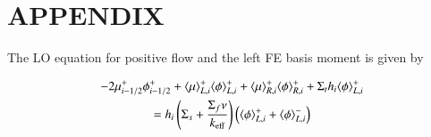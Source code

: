 \documentclass[10pt,twocolumn,pdftex,superscriptaddress]{anstrans}
\newcommand{\mom}[1]{\langle #1 \rangle}
\newcommand{\keff}{\ensuremath{k_{\text{eff}}}}
\newcommand{\sig}[1]{\ensuremath{\Sigma_{#1}}}
\begin{document}
\section*{APPENDIX}
\appendix 

The LO equation for positive flow and the left FE basis moment is given by
\vspace{-0.02in}

\begin{multline}\small 
\label{lo_eq}
    -2{\mu}_{i-1/2}^+ \phi_{i-1/2}^+ + \mom {\mu}_{L,i}^+ \mom{\phi}_{L,i}^+ +
    \mom\mu_{R,i}^+ 
    \mom{\phi}_{R,i}^+ + \Sigma_t h_i \mom{\phi}_{L,i}^+ \\ = h_i \left(\Sigma_s + 
    \frac{\sig f \nu}{\keff} \right)   \left( \mom{\phi}_{L,i}^+ +
\mom\phi_{L,i}^-\right) 
\end{multline}
\end{document}
